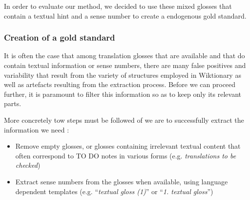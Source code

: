 \documentclass[10pt, a4paper]{article}
\begin{document}
In order to evaluate our method, we decided to use these mixed glosses that contain a textual hint and a sense number to create a endogenous gold standard.

\subsubsection{Creation of a gold standard}

It is often the case that among translation glosses that are available and that do contain textual information or sense numbers, there are many false positives and variability that result from the variety of structures employed in Wiktionary as well as artefacts resulting from the extraction process. Before we can proceed further, it is paramount to filter this information so as to keep only its relevant parts. 

More concretely tow steps must be followed of we are to successfully extract the information we need :
\begin{itemize}
   \item Remove empty glosses, or glosses containing irrelevant textual content that often correspond to TO DO notes in various forms (e.g. \emph{translations to be checked})
   \item Extract sense numbers from the glosses when available, using language dependent templates (e.g. ``\emph{textual gloss (1)}'' or ``\emph{1. textual gloss}'') 
\end{itemize}
\end{document}
